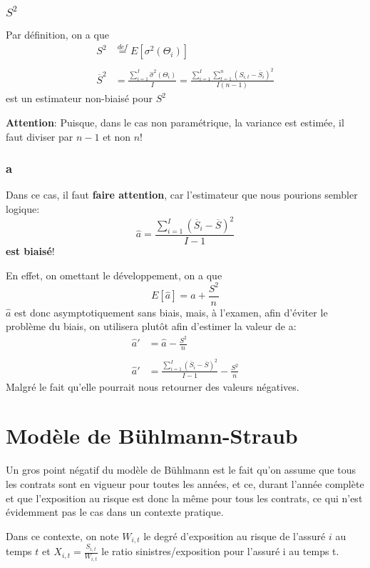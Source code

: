 \subsubsection{\textit{$S^2$}} 
Par définition, on a que 
$$\boxed{\begin{aligned}
S^2 &\overset{def}{=} E[\sigma^2(\Theta_i)] \\ \\
\overline{S}^2 &= \frac{\sum_{i=1}^I \widehat{\sigma}^2(\Theta_i)}{I} = \frac{\sum_{i=1}^I \sum_{t=1}^n (S_{i,t}-\overline{S}_i)^2}{I(n-1)}
\end{aligned}}$$
est un estimateur non-biaisé pour $S^2$

\textbf{Attention}: Puisque, dans le cas non paramétrique, la variance est estimée, il faut diviser par $n-1$ et non $n$!

\subsubsection{a}
Dans ce cas, il faut \textbf{faire attention}, car l'estimateur que nous pourions sembler logique:
$$\boxed{\widehat{a} = \frac{\sum_{i=1}^I (\overline{S}_i - \overline{S})^2}{I-1}}$$
\textbf{est biaisé}!

En effet, on omettant le développement, on a que 
$$E[\widehat{a}] = a + \frac{S^2}{n}$$
$\widehat{a}$ est donc asymptotiquement sans biais, mais, à l'examen, afin d'éviter le problème du biais, on utilisera plutôt afin d'estimer la valeur de a:
$$\boxed{\begin{aligned}
\widehat{a}' &= \widehat{a} - \frac{S^2}{n} \\ \\
\widehat{a}' &= \frac{\sum_{i=1}^I (\overline{S}_i - \overline{S})^2}{I-1} - \frac{S^2}{n}
\end{aligned}}$$
Malgré le fait qu'elle pourrait nous retourner des valeurs négatives.

\section{Modèle de Bühlmann-Straub } 

Un gros point négatif du modèle de Bühlmann est le fait qu'on assume que tous les contrats sont en vigueur pour toutes les années, et ce, durant l'année complète et que l'exposition au risque est donc la même pour tous les contrats, ce qui n'est évidemment pas le cas dans un contexte pratique.

Dans ce contexte, on note $W_{i,t}$ le degré d'exposition au risque de l'assuré $i$ au temps $t$ et $X_{i,t}= \frac{S_{i,t}}{W_{i,t}}$ le ratio sinistres/exposition pour l'assuré i au temps t.

